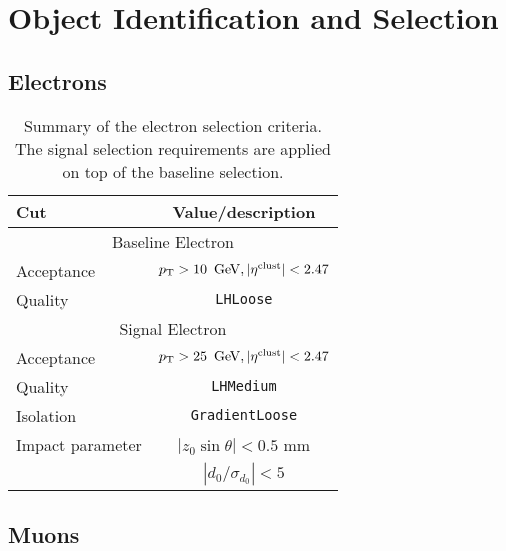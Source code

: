 
\chapter{Object Identification and Selection} %

\label{ch:objects} 


\section{Electrons}

\begin{table}[ph!]
\begin{center}
    \begin{tabular}{|l|c|}
      \hline
      Cut            & Value/description \\
      \hline
      \hline
      \multicolumn{2}{|c|}{Baseline Electron}\\
      \hline
      Acceptance   & $\pt > 10\,\GeV, |\eta^\mathrm{clust}| < 2.47$ \\
      Quality      & \texttt{LHLoose} \\
      \hline
      \multicolumn{2}{|c|}{Signal Electron}\\
      \hline
      Acceptance   & $\pt > 25\,\GeV, |\eta^\mathrm{clust}| < 2.47$ \\
      Quality          & \texttt{LHMedium} \\
      Isolation        & \texttt{GradientLoose} \\
      Impact parameter & $|z_0 \sin\theta|< 0.5$ mm \\
                       & $|d_0/\sigma_{d_0}|< 5$ \\ 
      \hline
\end{tabular}
\end{center}
\caption{Summary of the electron selection criteria. The signal selection requirements are applied on top of the baseline selection.
  }              
\label{tab:eledef}
\end{table}

\section{Muons}

